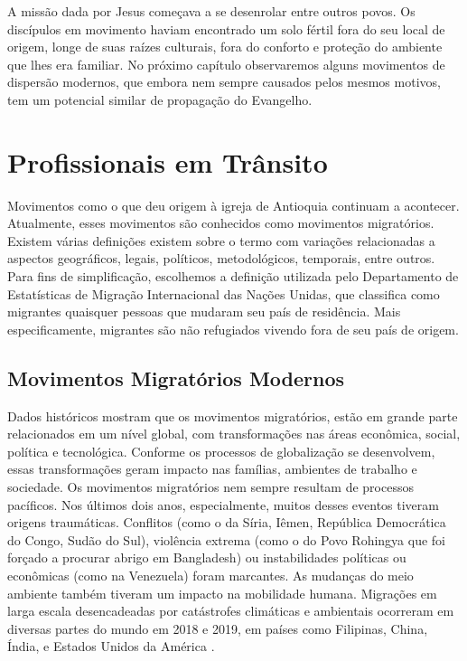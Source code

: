 \documentclass[12pt,openright,oneside,a4paper]{abntex2}
\begin{document}
A missão dada por Jesus começava a se desenrolar entre outros povos. Os discípulos em movimento haviam encontrado um solo fértil fora do seu local de origem, longe de suas raízes culturais, fora do conforto e proteção do ambiente que lhes era familiar. No próximo capítulo observaremos alguns movimentos de dispersão modernos, que embora nem sempre causados pelos mesmos motivos, tem um potencial similar de propagação do Evangelho.

\chapter{Profissionais em Trânsito}

Movimentos como o que deu origem à igreja de Antioquia continuam a acontecer. Atualmente, esses movimentos são conhecidos como movimentos migratórios. Existem várias definições existem sobre o termo com variações relacionadas a aspectos geográficos, legais, políticos, metodológicos, temporais, entre outros\cite{iom2020}. Para fins de simplificação, escolhemos a definição utilizada pelo Departamento de Estatísticas de Migração Internacional das Nações Unidas, que classifica como migrantes quaisquer pessoas que mudaram seu país de residência. Mais especificamente, migrantes são não refugiados vivendo fora de seu país de origem. 

\section {Movimentos Migratórios Modernos}

Dados históricos mostram que os movimentos migratórios, estão em grande parte relacionados em um nível global, com transformações nas áreas econômica, social, política e tecnológica. Conforme os processos de globalização se desenvolvem, essas transformações geram impacto nas famílias, ambientes de trabalho e sociedade. Os movimentos migratórios nem sempre resultam de processos pacíficos. Nos últimos dois anos, especialmente, muitos desses eventos tiveram origens traumáticas. Conflitos (como o da Síria, Iêmen, República Democrática do Congo, Sudão do Sul), violência extrema (como o do Povo Rohingya que foi forçado a procurar abrigo em Bangladesh) ou instabilidades políticas ou econômicas (como na Venezuela) foram marcantes. As mudanças do meio ambiente também tiveram um impacto na mobilidade humana. Migrações em larga escala desencadeadas por catástrofes climáticas e ambientais ocorreram em diversas partes do mundo em 2018 e 2019, em países como Filipinas, China, Índia, e Estados Unidos da América \cite[p. 19]{iom2020}.
\end{document}
